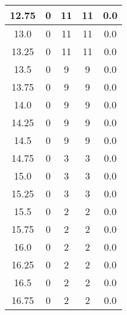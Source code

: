 \documentclass[letterpaper, 12pt]{article}
\begin{document}
\begin{longtable}{|c|c|c|c|c|}
\hline
12.75 & 0 & 11 & 11 & 0.0 \\
\hline
13.0 & 0 & 11 & 11 & 0.0 \\
\hline
13.25 & 0 & 11 & 11 & 0.0 \\
\hline
13.5 & 0 & 9 & 9 & 0.0 \\
\hline
13.75 & 0 & 9 & 9 & 0.0 \\
\hline
14.0 & 0 & 9 & 9 & 0.0 \\
\hline
14.25 & 0 & 9 & 9 & 0.0 \\
\hline
14.5 & 0 & 9 & 9 & 0.0 \\
\hline
14.75 & 0 & 3 & 3 & 0.0 \\
\hline
15.0 & 0 & 3 & 3 & 0.0 \\
\hline
15.25 & 0 & 3 & 3 & 0.0 \\
\hline
15.5 & 0 & 2 & 2 & 0.0 \\
\hline
15.75 & 0 & 2 & 2 & 0.0 \\
\hline
16.0 & 0 & 2 & 2 & 0.0 \\
\hline
16.25 & 0 & 2 & 2 & 0.0 \\
\hline
16.5 & 0 & 2 & 2 & 0.0 \\
\hline
16.75 & 0 & 2 & 2 & 0.0 \\
\hline
\end{longtable}
\end{document}
